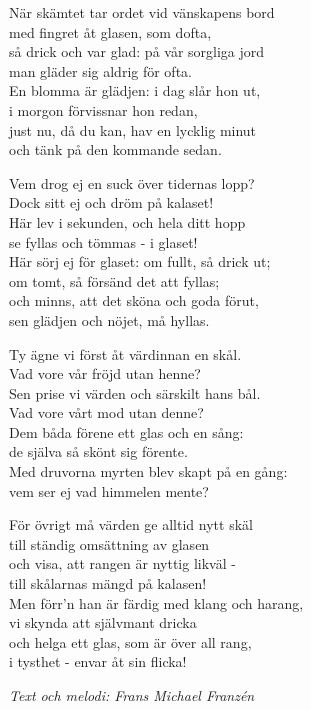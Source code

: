 \vspace{10pt}
När skämtet tar ordet vid vänskapens bord\\
med fingret åt glasen, som dofta,\\
så drick och var glad: på vår sorgliga jord\\
man gläder sig aldrig för ofta.\\
En blomma är glädjen: i dag slår hon ut,\\
i morgon förvissnar hon redan,\\
just nu, då du kan, hav en lycklig minut\\
och tänk på den kommande sedan.\par
\vspace{10pt}
Vem drog ej en suck över tidernas lopp?\\
Dock sitt ej och dröm på kalaset!\\
Här lev i sekunden, och hela ditt hopp\\
se fyllas och tömmas - i glaset!\\
Här sörj ej för glaset: om fullt, så drick ut;\\
om tomt, så försänd det att fyllas;\\
och minns, att det sköna och goda förut,\\
sen glädjen och nöjet, må hyllas.\par
\newpage
Ty ägne vi först åt värdinnan en skål.\\
Vad vore vår fröjd utan henne?\\
Sen prise vi värden och särskilt hans bål.\\
Vad vore vårt mod utan denne?\\
Dem båda förene ett glas och en sång:\\
de själva så skönt sig förente.\\
Med druvorna myrten blev skapt på en gång:\\
vem ser ej vad himmelen mente?\par
\vspace{10pt}
För övrigt må värden ge alltid nytt skäl\\
till ständig omsättning av glasen\\
och visa, att rangen är nyttig likväl -\\
till skålarnas mängd på kalasen!\\
Men förr'n han är färdig med klang och harang,\\
vi skynda att självmant dricka\\
och helga ett glas, som är över all rang,\\
i tysthet - envar åt sin flicka!\par
\vspace{10pt}
{\footnotesize\textit{Text och melodi: Frans Michael Franzén}}
